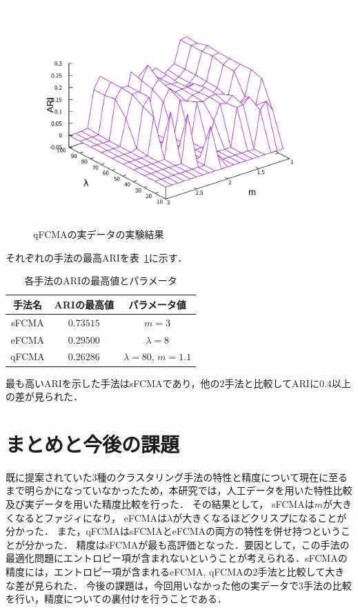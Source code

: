 \documentclass[twocolumn, a4paper]{icethesisabst}
\begin{document}
\begin{figure}[htbp]
\begin{minipage}{0.43\hsize}
  \includegraphics[width=\linewidth]{qFCMA_ARI.pdf}
  \caption{qFCMAの実データの実験結果}
  \label{fig:qFCMA_ARI}
 \end{minipage}
\end{figure}

それぞれの手法の最高ARIを表~\ref{tbl:max_ari}に示す．

\begin{table}[htbp]
 \centering
 \caption{各手法のARIの最高値とパラメータ}
  \begin{center}
   \begin{tabular}{ c || c | c }\hline
    手法名 & ARIの最高値 & パラメータ値\\ \hline \hline
    sFCMA & $0.73515$ & $m = 3$\\ \hline
    eFCMA & $0.29500$& $\lambda = 8$\\ \hline  
    qFCMA & $0.26286$ & $\lambda = 80$, $m = 1.1$\\  \hline
   \end{tabular}
   \label{tbl:max_ari}
  \end{center}
\end{table}

最も高いARIを示した手法はsFCMAであり，他の$2$手法と比較してARIに$0.4$以上の差が見られた．


\section{まとめと今後の課題}
既に提案されていた3種のクラスタリング手法の特性と精度について現在に至るまで明らかになっていなかったため，本研究では，人工データを用いた特性比較及び実データを用いた精度比較を行った．
その結果として，
sFCMAは$m$が大きくなるとファジィになり，
eFCMAは$\lambda$が大きくなるほどクリスプになることが分かった．
また，qFCMAはsFCMAとeFCMAの両方の特性を併せ持つということが分かった．
精度はsFCMAが最も高評価となった．要因として，この手法の最適化問題にエントロピー項が含まれないということが考えられる．sFCMAの精度には，エントロピー項が含まれるeFCMA, qFCMAの2手法と比較して大きな差が見られた．
今後の課題は，今回用いなかった他の実データで$3$手法の比較を行い，精度についての裏付けを行うことである．
\end{document}
